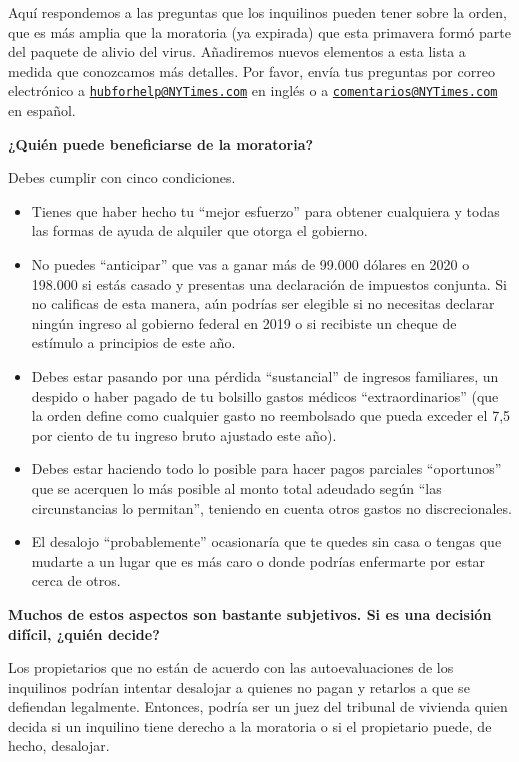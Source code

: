 Aquí respondemos a las preguntas que los inquilinos pueden tener sobre
la orden, que es más amplia que la moratoria (ya expirada) que esta
primavera formó parte del paquete de alivio del virus. Añadiremos nuevos
elementos a esta lista a medida que conozcamos más detalles. Por favor,
envía tus preguntas por correo electrónico a
\href{mailto:hubforhelp@NYTimes.com}{\nolinkurl{hubforhelp@NYTimes.com}}
en inglés o a
\href{mailto:comentarios@NYTimes.com}{\nolinkurl{comentarios@NYTimes.com}}
en español.

\textbf{¿Quién puede beneficiarse de la moratoria?}

Debes cumplir con cinco condiciones.

\begin{itemize}
\item
  Tienes que haber hecho tu ``mejor esfuerzo'' para obtener cualquiera y
  todas las formas de ayuda de alquiler que otorga el gobierno.
\item
  No puedes ``anticipar'' que vas a ganar más de 99.000 dólares en 2020
  o 198.000 si estás casado y presentas una declaración de impuestos
  conjunta. Si no calificas de esta manera, aún podrías ser elegible si
  no necesitas declarar ningún ingreso al gobierno federal en 2019 o si
  recibiste un cheque de estímulo a principios de este año.
\item
  Debes estar pasando por una pérdida ``sustancial'' de ingresos
  familiares, un despido o haber pagado de tu bolsillo gastos médicos
  ``extraordinarios'' (que la orden define como cualquier gasto no
  reembolsado que pueda exceder el 7,5 por ciento de tu ingreso bruto
  ajustado este año).
\item
  Debes estar haciendo todo lo posible para hacer pagos parciales
  ``oportunos'' que se acerquen lo más posible al monto total adeudado
  según ``las circunstancias lo permitan'', teniendo en cuenta otros
  gastos no discrecionales.
\item
  El desalojo ``probablemente'' ocasionaría que te quedes sin casa o
  tengas que mudarte a un lugar que es más caro o donde podrías
  enfermarte por estar cerca de otros.
\end{itemize}

\textbf{Muchos de estos aspectos son bastante subjetivos. Si es una
decisión difícil, ¿quién decide?}

Los propietarios que no están de acuerdo con las autoevaluaciones de los
inquilinos podrían intentar desalojar a quienes no pagan y retarlos a
que se defiendan legalmente. Entonces, podría ser un juez del tribunal
de vivienda quien decida si un inquilino tiene derecho a la moratoria o
si el propietario puede, de hecho, desalojar.


